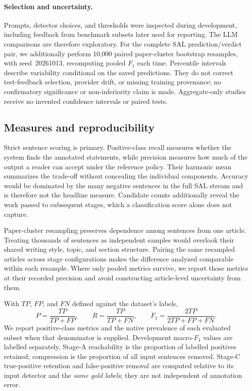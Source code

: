 \paragraph{Selection and uncertainty.}
Prompts, detector choices, and thresholds were inspected during development, including feedback
from benchmark subsets later used for reporting. The LLM comparisons are therefore exploratory.
For the complete SAL prediction/verdict pair, we additionally perform 10,000 paired
paper-cluster bootstrap resamples, with seed~20261013, recomputing pooled $F_1$ each time.
Percentile intervals describe variability conditional on the saved predictions. They do not
correct test-feedback selection, provider drift, or missing training provenance; no confirmatory
significance or non-inferiority claim is made. Aggregate-only studies receive no invented
confidence intervals or paired tests.

\subsection{Measures and reproducibility}
\label{S:measures}

Strict sentence scoring is primary. Positive-class recall measures whether the system finds the
annotated statements, while precision measures how much of the output a reader can accept under
the reference policy. Their harmonic mean summarizes the trade-off without concealing the
individual components. Accuracy would be dominated by the many negative sentences in the full
SAL stream and is therefore not the headline measure. Candidate counts additionally reveal the
work passed to subsequent stages, which a classification score alone does not capture.

Paper-cluster resampling preserves dependence among sentences from one article. Treating thousands
of sentences as independent samples would overlook their shared writing style, topic, and section
structure. Pairing the same resampled articles across stage configurations makes the difference
analyzed comparable within each resample. Where only pooled metrics survive, we report those
metrics at their recorded precision and avoid constructing article-level uncertainty from them.

With $TP$, $FP$, and $FN$ defined against the dataset's labels,
\begin{equation}
 P=\frac{TP}{TP+FP},\qquad R=\frac{TP}{TP+FN},\qquad
 F_1=\frac{2TP}{2TP+FP+FN}.
\end{equation}
We report positive-class metrics and the native prevalence of each evaluated subset when that
denominator is supplied. Development macro-$F_1$ values are labelled separately. Stage-A
reachability is the proportion of labelled positives retained; compression is the proportion of
all input sentences removed. Stage-C true-positive retention and false-positive removal are
computed relative to its input detector and the \emph{same gold labels}; they are not independent
of annotation error.

